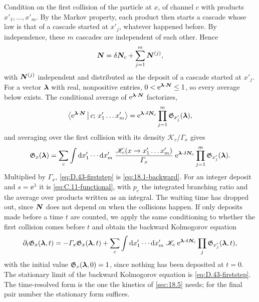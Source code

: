 Condition on the first collision of the particle at $x$, of channel $c$ with products $x'_1, \dots, x'_m$. By the Markov property, each product then starts a cascade whose law is that of a cascade started at $x'_j$, whatever happened before. By independence, these $m$ cascades are independent of each other. Hence
\begin{equation*}
  \bm{N} = \delta\bm{N}_c + \sum_{j=1}^m\bm{N}^{(j)} ,
\end{equation*}
with $\bm{N}^{(j)}$ independent and distributed as the deposit of a cascade started at $x'_j$. For a vector $\bm{\lambda}$ with real, nonpositive entries, $0 < \mathrm{e}^{\bm{\lambda}\cdot\bm{N}} \le 1$, so every average below exists. The conditional average of $\mathrm{e}^{\bm{\lambda}\cdot\bm{N}}$ factorizes,
\begin{equation*}
  \bigl\langle\mathrm{e}^{\bm{\lambda}\cdot\bm{N}}\,\big|\,c;\,x'_1\dots x'_m\bigr\rangle = \mathrm{e}^{\bm{\lambda}\cdot\delta\bm{N}_c}\prod_{j=1}^m\mathfrak{G}_{x'_j}(\bm{\lambda}) ,
\end{equation*}
and averaging over the first collision with its density $\mathscr{K}_c/\varGamma_x$ gives
\begin{equation}
  \mathfrak{G}_x(\bm{\lambda}) = \sum_c\int\mathrm{d} x'_1\cdots\mathrm{d} x'_m\;\frac{\mathscr{K}_c(x \to x'_1\dots x'_m)}{\varGamma_x}\;\mathrm{e}^{\bm{\lambda}\cdot\delta\bm{N}_c}\prod_{j=1}^m\mathfrak{G}_{x'_j}(\bm{\lambda}) .
  \label{eq:D.43-firststep}
\end{equation}
Multiplied by $\varGamma_x$, \cref{eq:D.43-firststep} is \cref{eq:18.1-backward}. For an integer deposit and $s = \ee^\lambda$ it is \cref{eq:C.11-functional}, with $p_c$ the integrated branching ratio and the average over products written as an integral. The waiting time has dropped out, since $\bm{N}$ does not depend on when the collisions happen. If only deposits made before a time $t$ are counted, we apply the same conditioning to whether the first collision comes before $t$ and obtain the backward Kolmogorov equation
\begin{equation*}
  \partial_t\mathfrak{G}_x(\bm{\lambda},t) = -\varGamma_x\mathfrak{G}_x(\bm{\lambda},t) + \sum_c\int\mathrm{d} x'_1\cdots\mathrm{d} x'_m\;\mathscr{K}_c\;\mathrm{e}^{\bm{\lambda}\cdot\delta\bm{N}_c}\prod_j\mathfrak{G}_{x'_j}(\bm{\lambda},t) ,
\end{equation*}
with the initial value $\mathfrak{G}_x(\bm{\lambda},0) = 1$, since nothing has been deposited at $t = 0$. The stationary limit of the backward Kolmogorov equation is \cref{eq:D.43-firststep}. The time-resolved form is the one the kinetics of \cref{sec:18.5} needs; for the final pair number the stationary form suffices.


